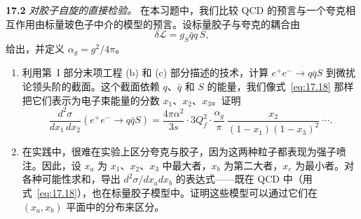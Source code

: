 \textbf{17.2} \emph{对胶子自旋的直接检验。} 在本习题中，我们比较 QCD 的预言与一个夸克相互作用由标量玻色子中介的模型的预言。设标量胶子与夸克的耦合由
\begin{equation}
  \delta\mathcal{L} = g_S\bar{q}q\,S ,
\end{equation}
给出，并定义 $\alpha_g = g^2/4\pi$。
\begin{enumerate}[label=(\alph*)]
  \item 利用第~I 部分末项工程 (b) 和 (c) 部分描述的技术，计算 $e^{+}e^{-}\to q\bar{q}S$ 到微扰论领头阶的截面。这个截面依赖 $q$、$\bar{q}$ 和 $S$ 的能量，我们像式~\eqref{eq:17.18} 那样把它们表示为电子束能量的分数 $x_1$、$x_2$、$x_3$。证明
    \begin{equation}
      \frac{d^2\sigma}{dx_1\,dx_2}(e^{+}e^{-}\to q\bar{q}S)
      = \frac{4\pi\alpha^2}{3s}\cdot 3Q_f^2\cdot
        \frac{\alpha_g}{\pi}\ \frac{x_2}{(1-x_1)(1-x_3)^2}\ \cdots .
    \end{equation}
  \item 在实践中，很难在实验上区分夸克与胶子，因为这两种粒子都表现为强子喷注。因此，设 $x_a$ 为 $x_1$、$x_2$、$x_3$ 中最大者，$x_b$ 为第二大者，$x_c$ 为最小者。对各种可能性求和，导出 $d^2\sigma/dx_adx_b$ 的表达式——既在 QCD 中（用式~\eqref{eq:17.18}），也在标量胶子模型中。证明这些模型可以通过它们在 $(x_a, x_b)$ 平面中的分布来区分。
\end{enumerate}

